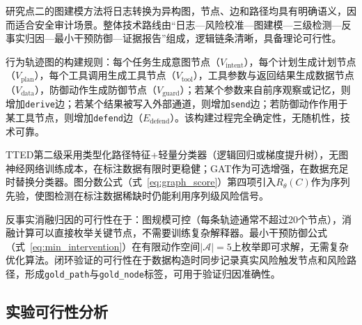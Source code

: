 研究点二的图建模方法将日志转换为异构图，节点、边和路径均具有明确语义，因而适合安全审计场景。整体技术路线由“日志—风险校准—图建模—三级检测—反事实归因—最小干预防御—证据报告”组成，逻辑链条清晰，具备理论可行性。

行为轨迹图的构建规则：每个任务生成意图节点（$V_{\text{intent}}$），每个计划生成计划节点（$V_{\text{plan}}$），每个工具调用生成工具节点（$V_{\text{tool}}$），工具参数与返回结果生成数据节点（$V_{\text{data}}$），防御动作生成防御节点（$V_{\text{guard}}$）；若某个参数来自前序观察或记忆，则增加\texttt{derive}边；若某个结果被写入外部通道，则增加\texttt{send}边；若防御动作作用于某工具节点，则增加\texttt{defend}边（$E_{\text{defend}}$）。该构建过程完全确定性，无随机性，技术可靠。

TTED第二级采用类型化路径特征+轻量分类器（逻辑回归或梯度提升树），无图神经网络训练成本，在标注数据有限时更稳健；GAT作为可选增强，在数据充足时替换分类器。图分数公式（式~\ref{eq:graph_score}）第四项引入$R_\theta(C)$作为序列先验，使图检测在标注数据稀缺时仍能利用序列级风险信号。

反事实消融归因的可行性在于：图规模可控（每条轨迹通常不超过20个节点），消融计算可以直接枚举关键节点，不需要训练复杂解释器。最小干预防御公式（式~\ref{eq:min_intervention}）在有限动作空间$|\mathcal{A}|=5$上枚举即可求解，无需复杂优化算法。闭环验证的可行性在于数据构造时同步记录真实风险触发节点和风险路径，形成\texttt{gold\_path}与\texttt{gold\_node}标签，可用于验证归因准确性。

\subsection{实验可行性分析}

